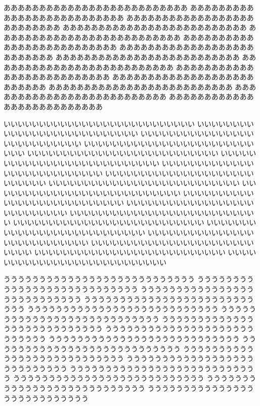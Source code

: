 \begin{bkshadebox}
%
ああああああああああああああああああああああああああ
ああああああああああああああああああああああああああ
ああああああああああああああああああああああああああ
ああああああああああああああああああああああああああ
ああああああああああああああああああああああああああ
ああああああああああああああああああああああああああ
ああああああああああああああああああああああああああ
ああああああああああああああああああああああああああ
ああああああああああああああああああああああああああ
ああああああああああああああああああああああああああ
ああああああああああああああああああああああああああ
ああああああああああああああああああああああああああ
ああああああああああああああああああああああああああ
ああああああああああああああああああああああああああ

いいいいいいいいいいいいいいいいいいいいいいいいいいい
いいいいいいいいいいいいいいいいいいいいいいいいいいい
いいいいいいいいいいいいいいいいいいいいいいいいいいい
いいいいいいいいいいいいいいいいいいいいいいいいいいい
いいいいいいいいいいいいいいいいいいいいいいいいいいい
いいいいいいいいいいいいいいいいいいいいいいいいいいい
いいいいいいいいいいいいいいいいいいいいいいいいいいい
いいいいいいいいいいいいいいいいいいいいいいいいいいい
いいいいいいいいいいいいいいいいいいいいいいいいいいい
いいいいいいいいいいいいいいいいいいいいいいいいいいい
いいいいいいいいいいいいいいいいいいいいいいいいいいい
いいいいいいいいいいいいいいいいいいいいいいいいいいい
いいいいいいいいいいいいいいいいいいいいいいいいいいい
いいいいいいいいいいいいいいいいいいいいいいいいいいい
いいいいいいいいいいいいいいいいいいいいいいいいいいい
いいいいいいいいいいいいいいいいいいいいいいいいいいい
いいいいいいいいいいいいいいいいいいいいいいいいいいい
いいいいいいいいいいいいいいいいいいいいいいいいいいい
いいいいいいいいいいいいいいいいいいいいいいいいいいい

ううううううううううううううううううううううううううう
ううううううううううううううううううううううううううう
ううううううううううううううううううううううううううう
ううううううううううううううううううううううううううう
ううううううううううううううううううううううううううう
ううううううううううううううううううううううううううう
ううううううううううううううううううううううううううう
ううううううううううううううううううううううううううう
ううううううううううううううううううううううううううう
ううううううううううううううううううううううううううう
ううううううううううううううううううううううううううう
ううううううううううううううううううううううううううう
ううううううううううううううううううううううううううう
ううううううううううううううううううううううううううう
ううううううううううううううううううううううううううう
ううううううううううううううううううううううううううう
\end{bkshadebox}
